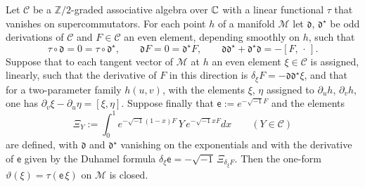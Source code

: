 \begin{lemma}\label{lem:abstract}
Let $\mathcal C$ be a $\mathbb Z/2$-graded associative algebra over $\mathbb C$
with a linear functional $\tau$ that vanishes on supercommutators. For each
point $h$ of a manifold $\mathcal M$ let $\mathfrak d$, $\mathfrak d^\star$
be odd derivations of $\mathcal C$ and $F\in\mathcal C$ an even element,
depending smoothly on $h$, such that
\[
 \tau\circ\mathfrak d=0=\tau\circ\mathfrak d^\star,\qquad
 \mathfrak dF=0=\mathfrak d^\star F,\qquad
 \mathfrak d\mathfrak d^\star+\mathfrak d^\star\mathfrak d=-[F,\,\cdot\,].
\]
Suppose that to each tangent vector of $\mathcal M$ at $h$ an even element
$\xi\in\mathcal C$ is assigned, linearly, such that the derivative of $F$
in this direction is $\delta_\xi F=-\mathfrak d\mathfrak d^\star\xi$, and
that for a two-parameter family $h(u,v)$, with the elements $\xi$, $\eta$
assigned to $\partial_uh$, $\partial_vh$, one has
$\partial_v\xi-\partial_u\eta=[\xi,\eta]$. Suppose finally that
$\mathsf e:=e^{-\sqrt{-1}F}$ and the elements
\[
 \Xi_Y:=\int_0^1e^{-\sqrt{-1}(1-x)F}\,Y\,e^{-\sqrt{-1}xF}dx\qquad(Y\in\mathcal C)
\]
are defined, with $\mathfrak d$ and $\mathfrak d^\star$ vanishing on the
exponentials and with the derivative of $\mathsf e$ given by the Duhamel
formula $\delta_\xi\mathsf e=-\sqrt{-1}\,\Xi_{\delta_\xi F}$. Then the one-form
$\vartheta(\xi)=\tau(\mathsf e\,\xi)$ on $\mathcal M$ is closed.
\end{lemma}


